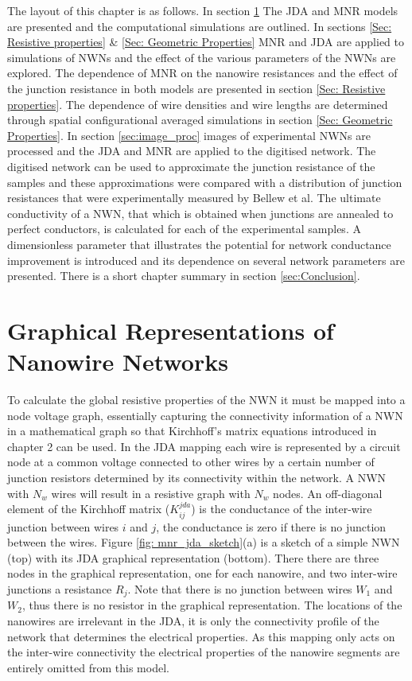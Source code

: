 The layout of this chapter is as follows. In section \ref{sec:Graphical Representations of NWNs} The JDA and MNR models are presented and the computational simulations are outlined. In sections \ref{Sec: Resistive properties} \& \ref{Sec: Geometric Properties} MNR and JDA are applied to simulations of NWNs and the effect of the various parameters of the NWNs are explored. The dependence of MNR on the nanowire resistances and the effect of the junction resistance in both models are presented in section \ref{Sec: Resistive properties}. The dependence of wire densities and wire lengths are determined through spatial configurational averaged simulations in section \ref{Sec: Geometric Properties}. In section \ref{sec:image_proc} images of experimental NWNs are processed and the JDA and MNR are applied to the digitised network. The digitised network can be used to approximate the junction resistance of the samples and these approximations were compared with a distribution of junction resistances that were experimentally measured by Bellew et al\cite{bellew2015}. The ultimate conductivity of a NWN, that which is obtained when junctions are annealed to perfect conductors, is calculated for each of the experimental samples. A dimensionless parameter that illustrates the potential for network conductance improvement is introduced and its dependence on several network parameters are presented. There is a short chapter summary in section \ref{sec:Conclusion}.

\section{Graphical Representations of Nanowire Networks}
\label{sec:Graphical Representations of NWNs}

To calculate the global resistive properties of the NWN it must be mapped into a node voltage graph, essentially capturing the connectivity information of a NWN in a mathematical graph so that Kirchhoff's matrix equations introduced in chapter 2 can be used. In the JDA mapping each wire is represented by a circuit node at a common voltage connected to other wires by a certain number of junction resistors determined by its connectivity within the network. A NWN with $N_w$ wires will result in a resistive graph with $N_w$ nodes. An off-diagonal element of the Kirchhoff matrix ($K^{jda}_{ij}$) is the conductance of the inter-wire junction between wires $i$ and $j$, the conductance is zero if there is no junction between the wires. Figure \ref{fig: mnr_jda_sketch}(a) is a sketch of a simple NWN (top) with its JDA graphical representation (bottom). There there are three nodes in the graphical representation, one for each nanowire, and two inter-wire junctions a resistance $R_j$. Note that there is no junction between wires $W_1$ and $W_2$, thus there is no resistor in the graphical representation. The locations of the nanowires are irrelevant in the JDA, it is only the connectivity profile of the network that determines the electrical properties. As this mapping only acts on the inter-wire connectivity the electrical properties of the nanowire segments are entirely omitted from this model.

